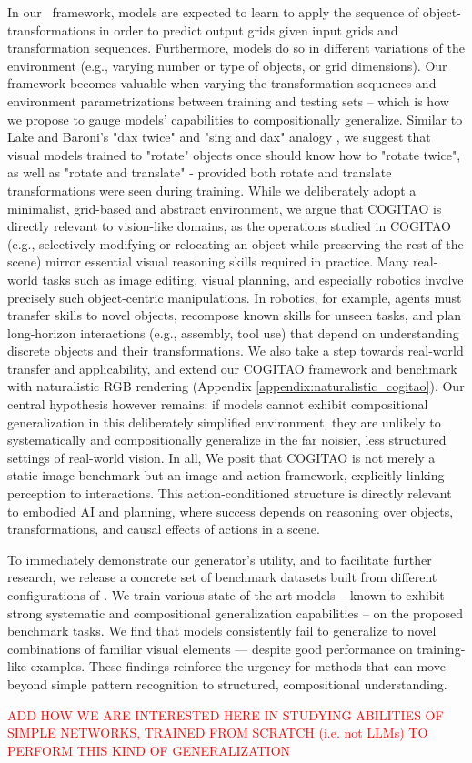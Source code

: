 In our \generatorName\ framework, models are expected to learn to apply the sequence of object-transformations in order to predict output grids given input grids and transformation sequences. Furthermore, models do so in different variations of the environment (e.g., varying number or type of objects, or grid dimensions). Our framework becomes valuable when varying the transformation sequences and environment parametrizations between training and testing sets -- which is how we propose to gauge models' capabilities to compositionally generalize. Similar to Lake and Baroni's "dax twice" and "sing and dax" analogy \cite{SCAN_lake_baroni}, we suggest that visual models trained to "rotate" objects once should know how to "rotate twice", as well as "rotate and translate" - provided both rotate and translate transformations were seen during training.
%
While we deliberately adopt a minimalist, grid-based and abstract environment, we argue that COGITAO is directly relevant to vision-like domains, as the operations studied in COGITAO (e.g., selectively modifying or relocating an object while preserving the rest of the scene) mirror essential visual reasoning skills required in practice. Many real-world tasks such as image editing, visual planning, and especially robotics involve precisely such object-centric manipulations. In robotics, for example, agents must transfer skills to novel objects, recompose known skills for unseen tasks, and plan long-horizon interactions (e.g., assembly, tool use) that depend on understanding discrete objects and their transformations.
%
We also take a step towards real-world transfer and applicability, and extend our COGITAO framework and benchmark with naturalistic RGB rendering (Appendix \ref{appendix:naturalistic_cogitao}). Our central hypothesis however remains: if models cannot exhibit compositional generalization in this deliberately simplified environment, they are unlikely to systematically and compositionally generalize in the far noisier, less structured settings of real-world vision. 
%
In all, We posit that COGITAO is not merely a static image benchmark but an image-and-action framework, explicitly linking perception to interactions. This action-conditioned structure is directly relevant to embodied AI and planning, where success depends on reasoning over objects, transformations, and causal effects of actions in a scene.


To immediately demonstrate our generator's utility, and to facilitate further research, we release a concrete set of benchmark datasets built from different configurations of \generatorName. We train various state-of-the-art models -- known to exhibit strong systematic and compositional generalization capabilities -- on the proposed benchmark tasks. We find that models consistently fail to generalize to novel combinations of familiar visual elements — despite good performance on training-like examples. These findings reinforce the urgency for methods that can move beyond simple pattern recognition to structured, compositional understanding.


\textcolor{red}{ADD HOW WE ARE INTERESTED HERE IN STUDYING ABILITIES OF SIMPLE NETWORKS, TRAINED FROM SCRATCH (i.e. not LLMs) TO PERFORM THIS KIND OF GENERALIZATION}

%

%